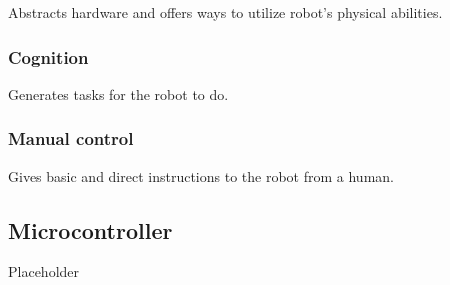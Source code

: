 \documentclass[11pt, a4paper]{article}
\begin{document}
    Abstracts hardware and offers ways to utilize robot's physical abilities.
    
    \subsubsection{Cognition}
    
    Generates tasks for the robot to do.
    
    \subsubsection{Manual control}
    
    Gives basic and direct instructions to the robot from a human.
    
    \subsection{Microcontroller}		
  
    Placeholder
  
\end{document}
